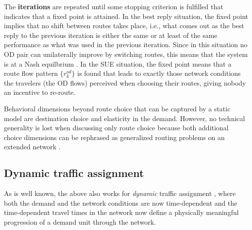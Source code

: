 The \textbf{iterations} are repeated until some stopping criterion is
fulfilled that indicates that a fixed point is attained.
In the best reply situation, the fixed point implies that no shift
between routes takes place, i.e., what comes out as the best reply to
the previous iteration is either the same or at least of the same
performance as what was used in the previous iteration.
Since in this situation no OD pair can unilaterally improve
by switching routes, this means that the system is at a Nash
equilbrium \citep[e.g.,][]{HofbSigmBook}.
In the SUE situation, the fixed point means that a route flow pattern 
$\{r^{od}_k\}$ is found that leads to exactly those network conditions the
travelers (the OD flows) perceived when choosing their routes,
giving nobody an incentive to re-route.

Behavioral dimensions beyond route choice that can be captured by a
static model are destination choice and elasticity in the
demand. However, no technical generality is lost when discussing only
route choice because both additional choice dimensions can be
rephrased as generalized routing problems on an extended network
\citep[``supernetwork''; see, e.g.,][]{sheffi-1985,NagurneyEtcSupernetworks}. 


\subsection{Dynamic traffic assignment}

As is well known, the above also works for \emph{dynamic} traffic
assignment \citep[DTA; see][]{peeta-2001}, where both the demand and the network conditions are now time-dependent and the time-dependent travel times in the network now define a physically meaningful progression of a demand unit through the network. 

